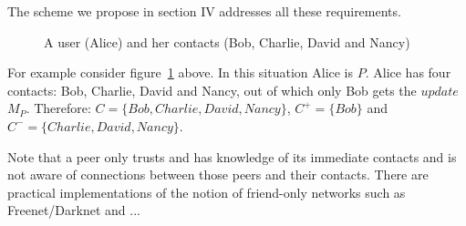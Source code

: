The scheme we propose in section IV addresses all these requirements.

\begin{figure}[here]
\caption{A user (Alice) and her contacts (Bob, Charlie, David and Nancy)}
\label{fig:fig1}
\end{figure}

For example consider figure~\ref{fig:fig1} above. In this situation Alice is $P$. Alice has four contacts: Bob, Charlie, David and Nancy, out of which only Bob gets the $update$ $M_P$. Therefore: $C = \{Bob, Charlie, David,Nancy\}$, ${C^+ = \{Bob\}}$ and ${C^- = \{Charlie, David,Nancy\}}$. 

Note that a peer only trusts and has knowledge of its immediate contacts and is not aware of connections between those peers and their contacts. There are practical implementations of the notion of friend-only networks such as Freenet/Darknet \cite{darknet} and ...

